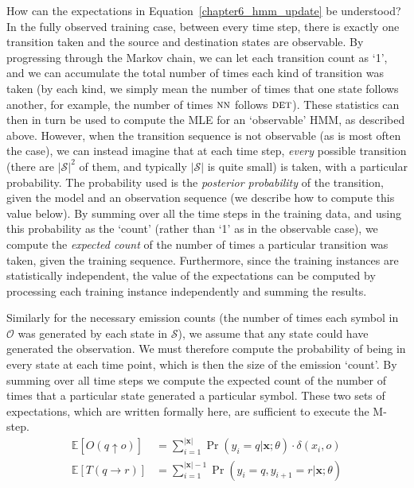How can the expectations in Equation~\ref{chapter6_hmm_update} be
understood?  In the fully observed training case, between every time
step, there is exactly one transition taken and the source and
destination states are observable.  By progressing through the Markov
chain, we can let each transition count as `1', and we can accumulate
the total number of times each kind of transition was taken (by each
kind, we simply mean the number of times that one state follows
another, for example, the number of times $\textsc{nn}$ follows
$\textsc{det}$).  These statistics can then in turn be used to compute
the MLE for an `observable' HMM, as described above.  However, when
the transition sequence is not observable (as is most often the case),
we can instead imagine that at each time step, \emph{every} possible
transition (there are $|\mathcal{S}|^2$ of them, and typically
$|\mathcal{S}|$ is quite small) is taken, with a particular
probability.  The probability used is the \emph{posterior probability}
of the transition, given the model and an observation sequence (we
describe how to compute this value below).  By summing over all the
time steps in the training data, and using this probability as the
`count' (rather than `1' as in the observable case), we compute the
\emph{expected count} of the number of times a particular transition
was taken, given the training sequence.  Furthermore, since the
training instances are statistically independent, the value of the
expectations can be computed by processing each training instance
independently and summing the results.

Similarly for the necessary emission counts (the number of times each
symbol in $\mathcal{O}$ was generated by each state in $\mathcal{S}$),
we assume that any state could have generated the observation.  We
must therefore compute the probability of being in every state at each
time point, which is then the size of the emission `count'.  By
summing over all time steps we compute the expected count of the
number of times that a particular state generated a particular symbol.
These two sets of expectations, which are written formally here, are
sufficient to execute the M-step.
\begin{align}
\label{eq:chapter6_ex1} \mathbb{E}[O(q \uparrow o)]& = \sum_{i=1}^{|\textbf{x}|} \Pr(y_i = q | \textbf{x}; \theta) \cdot \delta(x_i,o) \\
\label{eq:chapter6_ex1a} \mathbb{E}[T(q \rightarrow r)] & = \sum_{i=1}^{|\textbf{x}|-1} \Pr(y_i = q , y_{i+1} = r | \textbf{x}; \theta)
\end{align}

